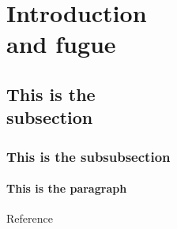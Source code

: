 \documentclass{WileySix}
\begin{document}




\section[Introduction and fugue]{Introduction\\ and fugue}
\subsection[This is the subsection]{This is the\\ subsection}
\subsubsection{This is the subsubsection}
\paragraph{This is the paragraph}

\begin{chapreferences}
Reference
\end{chapreferences}


\chapbblname{}      %
\chapbibliography{} %
\end{document}
